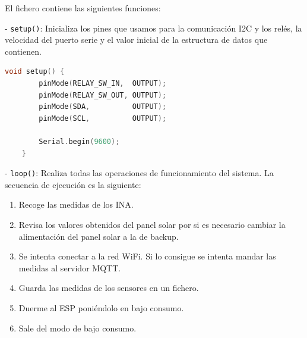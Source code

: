 El fichero contiene las siguientes funciones:

- \texttt{setup()}: Inicializa los pines que usamos para la comunicación I2C y los relés, la velocidad del puerto serie y el valor inicial de la estructura de datos que contienen.

\begin{lstlisting}[captionpos=b, caption={Codigo de la funcion setup}, language=c++]
    void setup() {
        pinMode(RELAY_SW_IN,  OUTPUT);
        pinMode(RELAY_SW_OUT, OUTPUT);
        pinMode(SDA,          OUTPUT);
        pinMode(SCL,          OUTPUT);
    
        Serial.begin(9600);
    }    
\end{lstlisting}

- \texttt{loop()}: Realiza todas las operaciones de funcionamiento del sistema. La secuencia de ejecución es la siguiente:
\begin{enumerate}
    \item Recoge las medidas de los INA.
    \item Revisa los valores obtenidos del panel solar por si es necesario cambiar la alimentación del panel solar a la de backup.
    \item Se intenta conectar a la red WiFi. Si lo consigue se intenta mandar las medidas al servidor MQTT.
    \item Guarda las medidas de los sensores en un fichero.
    \item Duerme al ESP poniéndolo en bajo consumo.
    \item Sale del modo de bajo consumo.
\end{enumerate}

